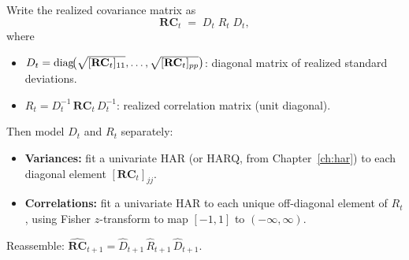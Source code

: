 \begin{keyidea}
Write the realized covariance matrix as
\begin{equation}\label{eq:drd}
  \mathbf{RC}_t \;=\; D_t\; R_t\; D_t,
\end{equation}
where
\begin{itemize}[nosep]
  \item $D_t = \operatorname{diag}\!\bigl(\sqrt{[\mathbf{RC}_t]_{11}}, \ldots,
        \sqrt{[\mathbf{RC}_t]_{pp}}\bigr)$: diagonal matrix of realized
        standard deviations.
  \item $R_t = D_t^{-1}\,\mathbf{RC}_t\, D_t^{-1}$: realized correlation
        matrix (unit diagonal).
\end{itemize}
Then model $D_t$ and $R_t$ separately:
\begin{itemize}[nosep]
  \item \textbf{Variances:} fit a univariate HAR (or HARQ, from
        Chapter~\ref{ch:har}) to each diagonal element $[\mathbf{RC}_t]_{jj}$.
  \item \textbf{Correlations:} fit a univariate HAR to each unique off-diagonal
        element of $R_t$, using Fisher $z$-transform to map $[-1,1]$ to
        $(-\infty, \infty)$.
\end{itemize}
Reassemble: $\widehat{\mathbf{RC}}_{t+1} = \hat{D}_{t+1}\,\hat{R}_{t+1}\,\hat{D}_{t+1}$.
\end{keyidea}


